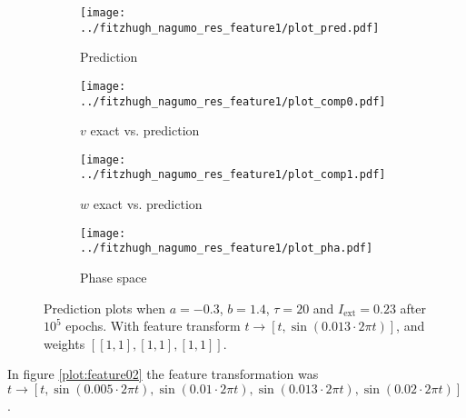 \documentclass[a4paper]{article}
\begin{document}
\begin{figure}[H]
	\centering 
	\begin{subfigure}[b]{0.47\textwidth}
		\centering
		\texttt{[image: ../fitzhugh\_nagumo\_res\_feature1/plot\_pred.pdf]}
		\caption{Prediction}
		\label{fig:feature01a}
	\end{subfigure}
	\begin{subfigure}[b]{0.47\textwidth}
		\centering
		\texttt{[image: ../fitzhugh\_nagumo\_res\_feature1/plot\_comp0.pdf]}
		\caption{$v$ exact vs. prediction}
		\label{fig:feature01b}
	\end{subfigure}
	\begin{subfigure}[b]{0.47\textwidth}
		\centering
		\texttt{[image: ../fitzhugh\_nagumo\_res\_feature1/plot\_comp1.pdf]}
		\caption{$w$ exact vs. prediction}
		\label{fig:feature01c}
	\end{subfigure}
	\begin{subfigure}[b]{0.47\textwidth}
		\centering
		\texttt{[image: ../fitzhugh\_nagumo\_res\_feature1/plot\_pha.pdf]}
		\caption{Phase space}
		\label{fig:feature01d}
	\end{subfigure}
	\caption{Prediction plots when $a=-0.3$, $b=1.4$, $\tau=20$ and $ I_{\text{ext}}=0.23$ after $10^5$ epochs. With feature transform $t \rightarrow \left[  t, \sin(0.013\cdot 2 \pi t) \right]$, and weights $\left[ \left[ 1, 1\right], \left[ 1, 1\right], \left[ 1, 1\right]\right]$.}
	\label{plot:feature01}
\end{figure}

In figure \ref{plot:feature02}  the feature transformation was $t \rightarrow \left[  t, \sin(0.005\cdot 2 \pi t), \sin(0.01\cdot 2 \pi t), \sin(0.013\cdot 2 \pi t), \sin(0.02\cdot 2 \pi t) \right]$. 
\end{document}
